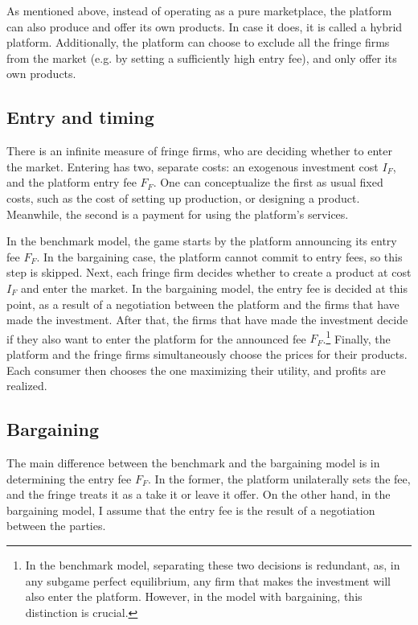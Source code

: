 \documentclass[a4paper]{article}
\begin{document}
As mentioned above, instead of operating as a pure marketplace, the platform can also produce and offer its own products.
In case it does, it is called a hybrid platform.
Additionally, the platform can choose to exclude all the fringe firms from the market (e.g. by setting a sufficiently high entry fee), and only offer its own products.  %

\subsection{Entry and timing}

There is an infinite measure of fringe firms, who are deciding whether to enter the market.
Entering has two, separate costs: an exogenous investment cost $I_F$, and the platform entry fee $F_F$.
One can conceptualize the first as usual fixed costs, such as the cost of setting up production, or designing a product.
Meanwhile, the second is a payment for using the platform's services.

In the benchmark model, the game starts by the platform announcing its entry fee $F_F$.
In the bargaining case, the platform cannot commit to entry fees, so this step is skipped.
Next, each fringe firm decides whether to create a product at cost $I_F$ and enter the market.
In the bargaining model, the entry fee is decided at this point, as a result of a negotiation between the platform and the firms that have made the investment.
After that, the firms that have made the investment decide if they also want to enter the platform for the announced fee $F_F$.\footnote{
    In the benchmark model, separating these two decisions is redundant, as, in any subgame perfect equilibrium, any firm that makes the investment will also enter the platform.
    However, in the model with bargaining, this distinction is crucial.
}
Finally, the platform and the fringe firms simultaneously choose the prices for their products.
Each consumer then chooses the one maximizing their utility, and profits are realized.

\subsection{Bargaining}

The main difference between the benchmark and the bargaining model is in determining the entry fee $F_F$.
In the former, the platform unilaterally sets the fee, and the fringe treats it as a take it or leave it offer.
On the other hand, in the bargaining model, I assume that the entry fee is the result of a negotiation between the parties.
\end{document}
